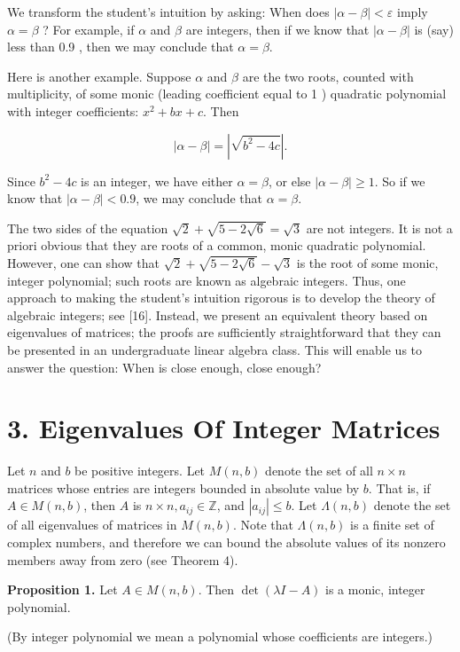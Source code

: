 \documentclass[11pt,letterpaper]{article}
\begin{document}
We transform the student's intuition by asking: When does $|\alpha-\beta|<\varepsilon$ imply $\alpha=\beta$ ? For example, if $\alpha$ and $\beta$ are integers, then if we know that $|\alpha-\beta|$ is (say) less than 0.9 , then we may conclude that $\alpha=\beta$.

Here is another example. Suppose $\alpha$ and $\beta$ are the two roots, counted with multiplicity, of some monic (leading coefficient equal to 1 ) quadratic polynomial with integer coefficients: $x^{2}+b x+c$. Then

\[
|\alpha-\beta|=\left|\sqrt{b^{2}-4 c}\right| .
\]

Since $b^{2}-4 c$ is an integer, we have either $\alpha=\beta$, or else $|\alpha-\beta| \geq 1$. So if we know that $|\alpha-\beta|<0.9$, we may conclude that $\alpha=\beta$.

The two sides of the equation $\sqrt{2}+\sqrt{5-2 \sqrt{6}}=\sqrt{3}$ are not integers. It is not a priori obvious that they are roots of a common, monic quadratic polynomial. However, one can show that $\sqrt{2}+\sqrt{5-2 \sqrt{6}}-\sqrt{3}$ is the root of some monic, integer polynomial; such roots are known as algebraic integers. Thus, one approach to making the student's intuition rigorous is to develop the theory of algebraic integers; see [16]. Instead, we present an equivalent theory based on eigenvalues of matrices; the proofs are sufficiently straightforward that they can be presented in an undergraduate linear algebra class. This will enable us to answer the question: When is close enough, close enough?

\section*{3. Eigenvalues Of Integer Matrices} Let $n$ and $b$ be positive integers. Let $M(n, b)$ denote the set of all $n \times n$ matrices whose entries are integers bounded in absolute value by $b$. That is, if $A \in M(n, b)$, then $A$ is $n \times n, a_{i j} \in \mathbb{Z}$, and $\left|a_{i j}\right| \leq b$. Let $\Lambda(n, b)$ denote the set of all eigenvalues of matrices in $M(n, b)$. Note that $\Lambda(n, b)$ is a finite set of complex numbers, and therefore we can bound the absolute values of its nonzero members away from zero (see Theorem 4).

\noindent\textbf{Proposition 1.} Let $A \in M(n, b)$. Then $\operatorname{det}(\lambda I-A)$ is a monic, integer polynomial.

(By integer polynomial we mean a polynomial whose coefficients are integers.)
\end{document}
